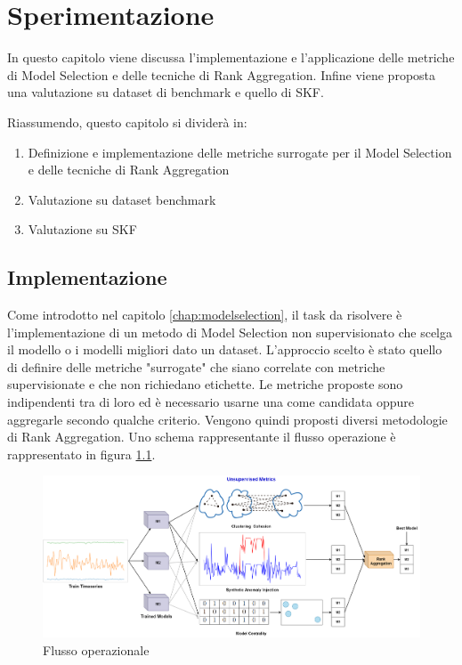 \chapter{Sperimentazione}
\label{chap:impl}

In questo capitolo viene discussa l'implementazione e l'applicazione delle metriche di Model Selection e delle tecniche di Rank Aggregation. Infine viene proposta una valutazione su dataset di benchmark e quello di SKF.

Riassumendo, questo capitolo si dividerà in:
\begin{enumerate}
	\item Definizione e implementazione delle metriche surrogate per il Model Selection e delle tecniche di Rank Aggregation
	\item Valutazione su dataset benchmark
	\item Valutazione su SKF
\end{enumerate}


\section{Implementazione}
Come introdotto nel capitolo \ref{chap:modelselection}, il task da risolvere è l'implementazione di un metodo di Model Selection non supervisionato che scelga il modello o i modelli migliori dato un dataset. L'approccio scelto è stato quello di definire delle metriche "surrogate" che siano correlate con metriche supervisionate e che non richiedano etichette. Le metriche proposte sono indipendenti tra di loro ed è necessario usarne una come candidata oppure aggregarle secondo qualche criterio. Vengono quindi proposti diversi metodologie di Rank Aggregation. Uno schema rappresentante il flusso operazione è rappresentato in figura \ref{flow-scheme}.
\begin{figure}[t]
	\centering
	\includegraphics[width=14cm, scale=1]{images/model-selection-scheme}
	\caption{Flusso operazionale}
	\label{flow-scheme}
		
\end{figure}


